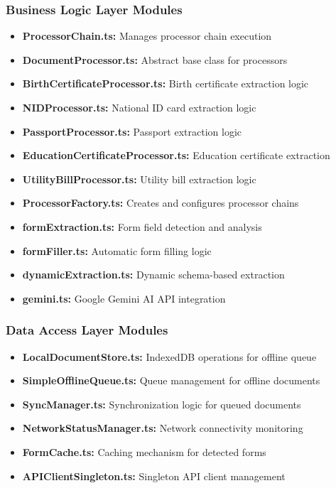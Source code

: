 \documentclass[11pt, a4paper]{article}
\theoremstyle{plain}
\theoremstyle{definition}
\begin{document}
\subsubsection{Business Logic Layer Modules}

\begin{itemize}
    \item \textbf{ProcessorChain.ts:} Manages processor chain execution
    \item \textbf{DocumentProcessor.ts:} Abstract base class for processors
    \item \textbf{BirthCertificateProcessor.ts:} Birth certificate extraction logic
    \item \textbf{NIDProcessor.ts:} National ID card extraction logic
    \item \textbf{PassportProcessor.ts:} Passport extraction logic
    \item \textbf{EducationCertificateProcessor.ts:} Education certificate extraction
    \item \textbf{UtilityBillProcessor.ts:} Utility bill extraction logic
    \item \textbf{ProcessorFactory.ts:} Creates and configures processor chains
    \item \textbf{formExtraction.ts:} Form field detection and analysis
    \item \textbf{formFiller.ts:} Automatic form filling logic
    \item \textbf{dynamicExtraction.ts:} Dynamic schema-based extraction
    \item \textbf{gemini.ts:} Google Gemini AI API integration
\end{itemize}

\subsubsection{Data Access Layer Modules}

\begin{itemize}
    \item \textbf{LocalDocumentStore.ts:} IndexedDB operations for offline queue
    \item \textbf{SimpleOfflineQueue.ts:} Queue management for offline documents
    \item \textbf{SyncManager.ts:} Synchronization logic for queued documents
    \item \textbf{NetworkStatusManager.ts:} Network connectivity monitoring
    \item \textbf{FormCache.ts:} Caching mechanism for detected forms
    \item \textbf{APIClientSingleton.ts:} Singleton API client management
\end{itemize}
\end{document}
